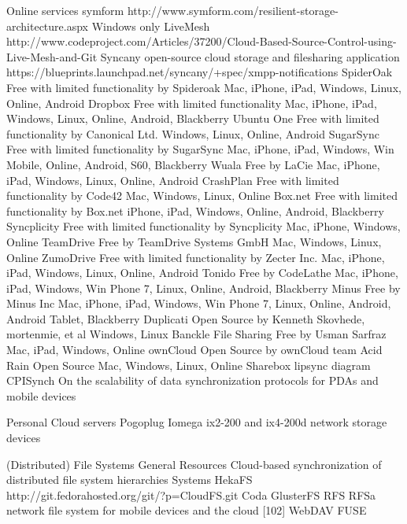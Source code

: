 		
		Online services
			symform
			http://www.symform.com/resilient-storage-architecture.aspx
				Windows only
			LiveMesh 
				http://www.codeproject.com/Articles/37200/Cloud-Based-Source-Control-using-Live-Mesh-and-Git
			Syncany
				open-source cloud storage and filesharing application
				https://blueprints.launchpad.net/syncany/+spec/xmpp-notifications 
			SpiderOak
				Free with limited functionality by Spideroak
				Mac, iPhone, iPad, Windows, Linux, Online, Android
			Dropbox
				Free with limited functionality 
				Mac, iPhone, iPad, Windows, Linux, Online, Android, Blackberry
			Ubuntu One
				Free with limited functionality by Canonical Ltd. 
				Windows, Linux, Online, Android
			SugarSync
				Free with limited functionality by SugarSync 
				Mac, iPhone, iPad, Windows, Win Mobile, Online, Android, S60, Blackberry
			Wuala
				Free by LaCie 
				Mac, iPhone, iPad, Windows, Linux, Online, Android
			CrashPlan
				Free with limited functionality by Code42 
				Mac, Windows, Linux, Online
			Box.net
				Free with limited functionality by Box.net
				iPhone, iPad, Windows, Online, Android, Blackberry
			Syncplicity
				Free with limited functionality by Syncplicity
				Mac, iPhone, Windows, Online
			TeamDrive
				Free by TeamDrive Systems GmbH 
				Mac, Windows, Linux, Online
			ZumoDrive
				Free with limited functionality by Zecter Inc.
				Mac, iPhone, iPad, Windows, Linux, Online, Android
			Tonido
				Free by CodeLathe 
				Mac, iPhone, iPad, Windows, Win Phone 7, Linux, Online, Android, Blackberry
			Minus
				Free by Minus Inc 
				Mac, iPhone, iPad, Windows, Win Phone 7, Linux, Online, Android, Android Tablet, Blackberry  
			Duplicati
				Open Source by Kenneth Skovhede, mortenmie, et al 
				Windows, Linux 
			 Banckle File Sharing
				Free by Usman Sarfraz 
				Mac, iPad, Windows, Online
			ownCloud
				Open Source by ownCloud team 
			Acid Rain
				Open Source
				Mac, Windows, Linux, Online 
			Sharebox
			lipsync
				diagram
			CPISynch 
				On the scalability of data synchronization protocols for PDAs and mobile devices
				
		Personal Cloud servers		
			Pogoplug
			Iomega
				ix2-200 and ix4-200d network storage devices

	(Distributed) File Systems
		General Resources
			Cloud-based synchronization of distributed file system hierarchies
		Systems
			HekaFS
			http://git.fedorahosted.org/git/?p=CloudFS.git 
			Coda
			GlusterFS
			RFS
				RFSa network file system for mobile devices and the cloud [102]
		WebDAV 
		FUSE		

